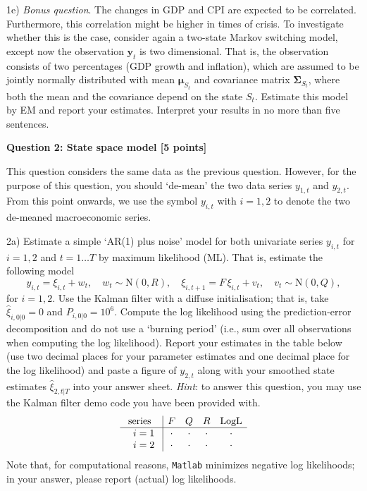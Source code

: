 \documentclass[12pt, a4paper]{article}
\newcommand{\Yy}{\mathbf{y}}
\newcommand{\SSigma}{\boldsymbol{\Sigma}}
\newcommand{\Mmu}{\boldsymbol{\mu}}
\begin{document}
\noindent 1e) \emph{Bonus question}. The changes in GDP and CPI are expected to be correlated. Furthermore, this correlation might be higher in times of crisis. To investigate whether this is the case, consider again a two-state Markov switching model,  except now the observation $\Yy_t$ is two dimensional. That is, the observation consists of two percentages (GDP growth and inflation), which are assumed to be jointly normally distributed with mean $\Mmu_{S_t}$ and covariance matrix $\SSigma_{S_t}$, where both the mean and the covariance depend on the state $S_t$. Estimate this model by EM and report your estimates. Interpret your results in no more than five sentences. 

\clearpage

\noindent \textbf{Question 2: State space model [5 points]}

\bigskip
\noindent This question considers the same data as the previous question. However, for the purpose of this question, you should `de-mean' the two data series $y_{1,t}$ and $y_{2,t}$. From this point onwards, we use the symbol $y_{i,t}$ with $i=1,2$ to denote the two de-meaned macroeconomic series.

\bigskip

\medskip\noindent 2a)  Estimate a simple `AR(1) plus noise' model for both univariate series $y_{i,t}$ for $i=1,2$ and $t=1\ldots T$ by maximum likelihood (ML). That is, estimate the following model
$$
y_{i,t} = \xi_{i,t} + w_t, \quad w_t \sim \mathrm{N}(0,R),\quad \xi_{i,t+1}=F\,\xi_{i,t} + v_t, \quad v_t \sim \mathrm{N}(0,Q),
$$
for $i=1,2$. Use the Kalman filter with a diffuse initialisation; that is, take $\widehat{\xi}_{i,0|0}=0$ and $P_{i,0|0}=10^6$. Compute the log likelihood using the prediction-error decomposition and do not use a `burning period' (i.e., sum over all observations when computing the log likelihood). Report your estimates in the table below (use two decimal places for your parameter estimates and one decimal place for the log likelihood) and paste a figure of $y_{2,t}$ along with your smoothed state estimates $\widehat{\xi}_{2,t|T}$ into your answer sheet. \emph{Hint}: to answer this question, you may use the Kalman filter demo code you have been provided with.
\[
\begin{array}{r@{\hspace{3mm}}|cccccccc}
   \mbox{ series }                   & F & Q & R & \mbox{LogL}\\ 
   \hline
i=1& \cdot & \cdot & \cdot  & \cdot \\

i=2& \cdot & \cdot & \cdot  & \cdot \\
\end{array}
\]
Note that, for computational reasons, \texttt{Matlab} minimizes negative log likelihoods; in your answer, please report (actual) log likelihoods.
\bigskip
\end{document}
